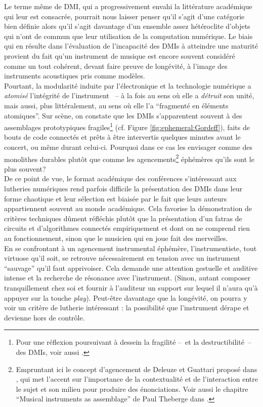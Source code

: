 \noindent Le terme même de \gls{DMI}, qui a progressivement envahi la littérature académique qui leur est consacrée, pourrait nous laisser penser qu'il s'agit d'une catégorie bien définie alors qu'il s'agit davantage d'un ensemble assez hétéroclite d'objets qui n'ont de commun que leur utilisation de la computation numérique. Le biais qui en résulte dans l'évaluation de l'incapacité des \glspl{DMI} à atteindre une maturité provient du fait qu'un instrument de musique est encore souvent considéré comme un tout cohérent, devant faire preuve de longévité, à l’image des instruments acoustiques pris comme modèles.\\
\indent Pourtant, la modularité induite par l'électronique et la technologie numérique a \textit{atomisé} l'intégrité de l'instrument ~-- à la fois au sens où elle a \textit{détruit} son unité, mais aussi, plus littéralement, au sens où elle l'a ``fragmenté en éléments atomiques''. Sur scène, on constate que les \glspl{DMI} s'apparentent souvent à des assemblages prototypiques fragiles\footnote{Pour une réflexion poursuivant à dessein la fragilité --~et la destructibilité~-- des \glspl{DMI}, voir aussi \cite{berthaut_wubbles:_2014, haddad_fragile_2017}.} (cf. Figure \ref{fig:ephemeral:Gordeff}), faits de bouts de code connectés et prêts à être intervertis quelques minutes avant le concert, ou même durant celui-ci. Pourquoi dans ce cas les envisager comme des monolithes durables plutôt que comme les agencements\footnote{Empruntant ici le concept d'agencement de Deleuze et Guattari proposé dans \cite{deleuze_mille_1980}, qui met l'accent sur l'importance de la contextualité et de l'interaction entre le sujet et son milieu pour produire des énonciations. Voir aussi le chapitre ``Musical instruments as assemblage'' de Paul Theberge dans \cite{bovermann_musical_2017}.} éphémères qu’ils sont le plus souvent?\\
\indent De ce point de vue, le format académique des conférences s'intéressant aux lutheries numériques rend parfois difficile la présentation des \glspl{DMI} dans leur forme chaotique et leur sélection est biaisée par le fait que leurs auteurs appartiennent souvent au monde académique. Cela favorise la démonstration de critères techniques dûment réfléchis plutôt que la présentation d'un fatras de circuits et d'algorithmes connectés empiriquement et dont on ne comprend rien au fonctionnement, sinon que le musicien qui en joue fait des merveilles.\\
\indent En se confrontant à un agencement instrumental éphémère, l'instrumentiste, tout virtuose qu'il soit, se retrouve nécessairement en tension avec un instrument ``sauvage'' qu'il faut apprivoiser. Cela demande une attention gestuelle et auditive intense et la recherche de résonance avec l'instrument. (Sinon, autant composer tranquillement chez soi et fournir à l’auditeur un support sur lequel il n’aura qu’à appuyer sur la touche \textit{play}). Peut-être davantage que la longévité, on pourra y voir un critère de lutherie intéressant : la possibilité que l'instrument dérape et devienne hors de contrôle.


